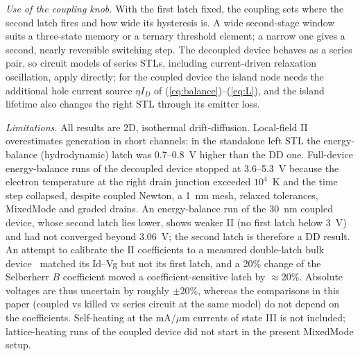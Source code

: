 \documentclass[journal]{IEEEtran}
\begin{document}
\textit{Use of the coupling knob.} With the first latch fixed, the coupling sets where the second latch fires and how wide its hysteresis is. A wide second-stage window suits a three-state memory or a ternary threshold element; a narrow one gives a second, nearly reversible switching step. The decoupled device behaves as a series pair, so circuit models of series STLs, including current-driven relaxation oscillation, apply directly; for the coupled device the island node needs the additional hole current source $\eta I_D$ of (\ref{eq:balance})--(\ref{eq:L}), and the island lifetime also changes the right STL through its emitter loss.

\textit{Limitations.} All results are 2D, isothermal drift-diffusion. Local-field II overestimates generation in short channels: in the standalone left STL the energy-balance (hydrodynamic) latch was 0.7--0.8~V higher than the DD one. Full-device energy-balance runs of the decoupled device stopped at 3.6--5.3~V because the electron temperature at the right drain junction exceeded $10^4$~K and the time step collapsed, despite coupled Newton, a 1~nm mesh, relaxed tolerances, MixedMode and graded drains. An energy-balance run of the 30~nm coupled device, whose second latch lies lower, shows weaker II (no first latch below 3~V) and had not converged beyond 3.06~V; the second latch is therefore a DD result. An attempt to calibrate the II coefficients to a measured double-latch bulk device~\cite{noh_triristor} matched its Id--Vg but not its first latch, and a 20\% change of the Selberherr $B$ coefficient moved a coefficient-sensitive latch by $\approx$20\%. Absolute voltages are thus uncertain by roughly $\pm$20\%, whereas the comparisons in this paper (coupled vs killed vs series circuit at the same model) do not depend on the coefficients. Self-heating at the mA/$\mu$m currents of state III is not included; lattice-heating runs of the coupled device did not start in the present MixedMode setup.
\end{document}
